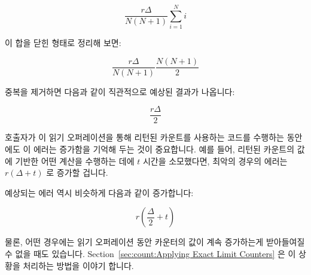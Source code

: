 {	\fi

	\begin{equation}
		\frac{r \Delta}{N \left( N + 1 \right)}
			\sum_{i = 1}^N i
	\end{equation}

	이 합을 닫힌 형태로 정리해 보면:

	\begin{equation}
		\frac{r \Delta}{N \left( N + 1 \right)}
			\frac{N \left( N + 1 \right)}{2}
	\end{equation}

	중복을 제거하면 다음과 같이 직관적으로 예상된 결과가 나옵니다:

	\begin{equation}
		\frac{r \Delta}{2}
	\label{eq:count:CounterErrorAverage}
	\end{equation}

	호출자가 이 읽기 오퍼레이션을 통해 리턴된 카운트를 사용하는 코드를
	수행하는 동안에도 이 에러는 증가함을 기억해 두는 것이 중요합니다.
	예를 들어, 리턴된 카운트의 값에 기반한 어떤 계산을 수행하는 데에 $t$
	시간을 소모했다면, 최악의 경우의 에러는 $r \left(\Delta + t\right)$ 로
	증가할 겁니다.

	예상되는 에러 역시 비슷하게 다음과 같이 증가합니다:

	\begin{equation}
		r \left( \frac{\Delta}{2} + t \right)
	\end{equation}

	물론, 어떤 경우에는 읽기 오퍼레이션 동안 카운터의 값이 계속 증가하는게
	받아들여질 수 없을 때도 있습니다.
	Section~\ref{sec:count:Applying Exact Limit Counters}
	은 이 상황을 처리하는 방법을 이야기 합니다.

}
